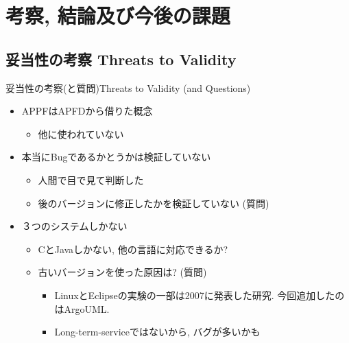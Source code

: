 \section{考察, 結論及び今後の課題 }
\subsection{妥当性の考察 Threats to Validity}
\begin{frame}{妥当性の考察(と質問)}{Threats to Validity (and Questions)}
\begin{itemize}
\item APPFはAPFDから借りた概念
    \begin{itemize}
    \item 他に使われていない
    \end{itemize}
\item 本当にBugであるかとうかは検証していない
    \begin{itemize}
    \item 人間で目で見て判断した
    \item 後のバージョンに修正したかを検証していない (質問)
    \end{itemize}
\item ３つのシステムしかない
    \begin{itemize}
    \item CとJavaしかない, 他の言語に対応できるか?
    \item 古いバージョンを使った原因は? (質問)
        \begin{itemize}
        \item LinuxとEclipseの実験の一部は2007に発表した研究.
        今回追加したのはArgoUML.
        \item Long-term-serviceではないから, バグが多いかも
        \end{itemize}
    \end{itemize}
\end{itemize}
\end{frame}
